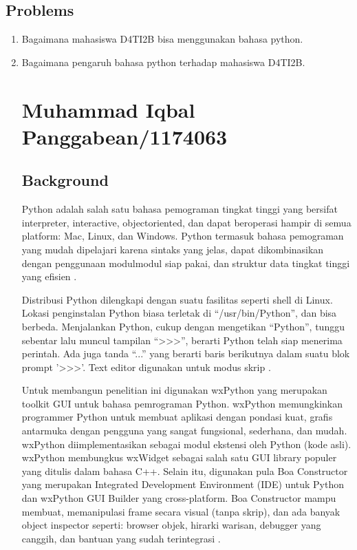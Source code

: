\subsection{Problems}
	\begin{enumerate}
		\item Bagaimana mahasiswa D4TI2B bisa menggunakan bahasa python.
		\item Bagaimana pengaruh bahasa python terhadap mahasiswa D4TI2B.

\section{Muhammad Iqbal Panggabean/1174063}
\subsection{Background}
	\par 
	Python adalah salah satu bahasa pemograman tingkat tinggi yang bersifat interpreter, interactive, objectoriented, dan dapat beroperasi hampir di semua platform: Mac, Linux, dan Windows. Python termasuk bahasa pemograman yang mudah dipelajari karena sintaks yang jelas, dapat dikombinasikan dengan penggunaan modulmodul siap pakai, dan struktur data tingkat tinggi yang efisien \cite{prasetya2012deteksi}. 
	\par
	Distribusi Python dilengkapi dengan suatu fasilitas seperti shell di Linux. Lokasi penginstalan Python biasa terletak di “/usr/bin/Python”, dan bisa berbeda. Menjalankan Python, cukup dengan mengetikan “Python”, tunggu sebentar lalu muncul tampilan “>>>”, berarti Python telah siap menerima perintah. Ada juga tanda “...” yang berarti baris berikutnya dalam suatu blok prompt '>>>'. Text editor digunakan untuk modus skrip \cite{obrst2003semantic}.
	\par
	Untuk membangun penelitian ini digunakan wxPython yang merupakan toolkit GUI untuk bahasa pemrograman Python. wxPython memungkinkan programmer Python untuk membuat aplikasi dengan pondasi kuat, grafis antarmuka dengan pengguna yang sangat fungsional, sederhana, dan mudah. wxPython diimplementasikan sebagai modul ekstensi oleh Python (kode asli). wxPython membungkus wxWidget sebagai salah satu GUI library populer yang ditulis dalam bahasa C++. Selain itu, digunakan pula Boa Constructor yang merupakan Integrated Development Environment (IDE) untuk Python dan wxPython GUI Builder yang cross-platform. Boa Constructor mampu membuat, memanipulasi frame secara visual (tanpa skrip), dan ada banyak object inspector seperti: browser objek, hirarki warisan, debugger yang canggih, dan bantuan yang sudah terintegrasi \cite{malikhah2016eksplorasi}.
	

\end{enumerate}
